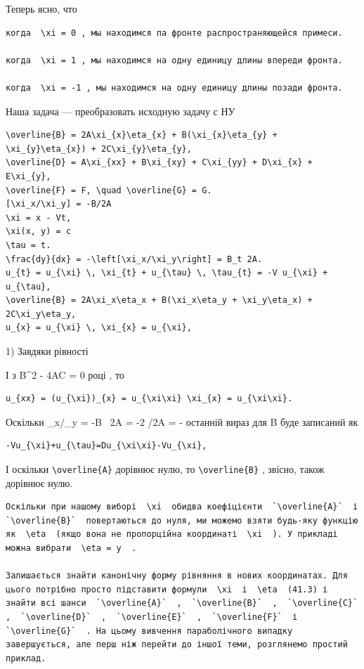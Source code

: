 \documentclass[
  ukrainian,
]{article}
\begin{document}
Теперь ясно, что

\begin{verbatim}
когда  \xi = 0 , мы находимся па фронте распространяющейся примеси.

когда  \xi = 1 , мы находимся на одну единицу длины впереди фронта.

когда  \xi = -1 , мы находимся на одну единицу длины позади фронта.
\end{verbatim}

Наша задача --- преобразовать исходную задачу с НУ

\begin{verbatim}
\overline{B} = 2A\xi_{x}\eta_{x} + B(\xi_{x}\eta_{y} + \xi_{y}\eta_{x}) + 2C\xi_{y}\eta_{y},
\overline{D} = A\xi_{xx} + B\xi_{xy} + C\xi_{yy} + D\xi_{x} + E\xi_{y},
\overline{F} = F, \quad \overline{G} = G.
[\xi_x/\xi_y] = -B/2A
\xi = x - Vt,
\xi(x, y) = c
\tau = t.
\frac{dy}{dx} = -\left[\xi_x/\xi_y\right] = B_t 2A.
u_{t} = u_{\xi} \, \xi_{t} + u_{\tau} \, \tau_{t} = -V u_{\xi} + u_{\tau},
\overline{B} = 2A\xi_x\eta_x + B(\xi_x\eta_y + \xi_y\eta_x) + 2C\xi_y\eta_y,
u_{x} = u_{\xi} \, \xi_{x} = u_{\xi},
\end{verbatim}

1) Завдяки рівності

І з B\^{}2 - 4AC = 0 році , то

\begin{verbatim}
u_{xx} = (u_{\xi})_{x} = u_{\xi\xi} \xi_{x} = u_{\xi\xi}.
\end{verbatim}

Оскільки \xi\_x/\xi\_y = -B ~2A = -2 /2A = -
останній вираз для B буде записаний як

\begin{verbatim}
-Vu_{\xi}+u_{\tau}=Du_{\xi\xi}-Vu_{\xi},
\end{verbatim}

І оскільки \texttt{\textbackslash{}overline\{A\}} дорівнює нулю, то
\texttt{\textbackslash{}overline\{B\}} , звісно, також дорівнює нулю.

\begin{verbatim}
Оскільки при нашому виборі  \xi  обидва коефіцієнти  `\overline{A}`  і  `\overline{B}`  повертаються до нуля, ми можемо взяти будь-яку функцію як  \eta  (якщо вона не пропорційна координаті  \xi  ). У прикладі можна вибрати  \eta = y  .

Залишається знайти канонічну форму рівняння в нових координатах. Для цього потрібно просто підставити формули  \xi  і  \eta  (41.3) і знайти всі шанси  `\overline{A}`  ,  `\overline{B}`  ,  `\overline{C}`  ,  `\overline{D}`  ,  `\overline{E}`  ,  `\overline{F}`  і  `\overline{G}`  . На цьому вивчення параболічного випадку завершується, але перш ніж перейти до іншої теми, розглянемо простий приклад.
\end{verbatim}
\end{document}
